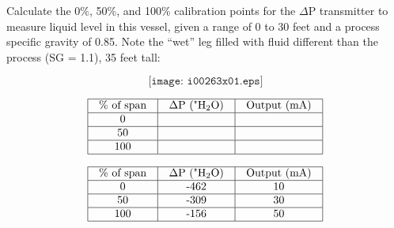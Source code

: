 

Calculate the 0\%, 50\%, and 100\% calibration points for the $\Delta$P transmitter to measure liquid level in this vessel, given a range of 0 to 30 feet and a process specific gravity of 0.85.  Note the ``wet'' leg filled with fluid different than the process (SG = 1.1), 35 feet tall:

$$\texttt{[image: i00263x01.eps]}$$


$$\vbox{\offinterlineskip
\halign{\strut
\vrule \quad\hfil # \ \hfil & 
\vrule \quad\hfil # \ \hfil & 
\vrule \quad\hfil # \ \hfil \vrule \cr
\noalign{\hrule}
%
\% of span & $\Delta$P ("H$_{2}$O) & Output (mA) \cr
%
\noalign{\hrule}
%
0 &  &  \cr
%
\noalign{\hrule}
%
50 &  &  \cr
%
\noalign{\hrule}
%
100 &  &  \cr
%
\noalign{\hrule}
} %
}$$ %








$$\vbox{\offinterlineskip
\halign{\strut
\vrule \quad\hfil # \ \hfil & 
\vrule \quad\hfil # \ \hfil & 
\vrule \quad\hfil # \ \hfil \vrule \cr
\noalign{\hrule}
%
\% of span & $\Delta$P ("H$_{2}$O) & Output (mA) \cr
%
\noalign{\hrule}
%
0 & -462 & 10 \cr
%
\noalign{\hrule}
%
50 & -309 & 30 \cr
%
\noalign{\hrule}
%
100 & -156 & 50 \cr
%
\noalign{\hrule}
} %
}$$ %











